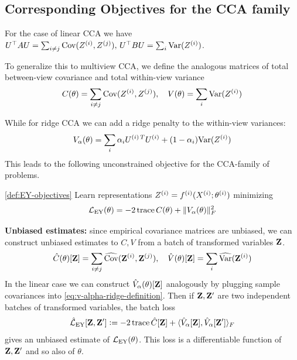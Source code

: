 \subsection{Corresponding Objectives for the CCA family}
For the case of linear CCA we have $U^\top A U = \sum_{i \neq j} \mathrm{Cov}(Z^{(i)}, Z^{(j)}),\,  U^\top B U = \sum_{i} \mathrm{Var}(Z^{(i)})$. 

To generalize this to multiview CCA, we define the analogous matrices of total between-view covariance and total within-view variance 
\begin{align}\label{eq:def-C-V-matrices}
    \vphantom{\bigl(\bigr)} %
    C(\theta) = \sum_{i \neq j} \Cov(Z\sps{i}, Z\sps{j}), \quad 
    V(\theta) = \sum_{i} \Var(Z\sps{i})
\end{align}

While for ridge CCA we can add a ridge penalty to the within-view variances:
\begin{align}\label{eq:v-alpha-ridge-definition}
    V_\alpha(\theta) = \sum_i \alpha_i {U^{(i)\,T}} U^{(i)} +  (1 - \alpha_i) \mathrm{Var}(Z^{(i)})
\end{align}
This leads to the following unconstrained objective for the CCA-family of problems.
\begin{definition}\ref{def:EY-objectives}
    Learn representations $Z^{(i)} = f^{(i)}( X^{(i)}; \theta^{(i)})$ minimizing
    \begin{align}\label{eq:EY-loss-def-C-V}
        \mathcal{L}_\text{EY}(\theta) = - 2 \operatorname{trace} C(\theta) + \lVert V_\alpha(\theta)\rVert_F^2
    \end{align}
\end{definition}

\textbf{Unbiased estimates:}
since empirical covariance matrices are unbiased, we can construct unbiased estimates to $C, V$ from a batch of transformed variables $\mathbf{Z}$.
\begin{align}\label{eq:def-C-V-matrices-empirical}
    \hat{C}(\theta)[\mathbf{Z}] = \sum_{i \neq j} \widehat{\mathrm{Cov}}(\mathbf{Z}^{(i)}, \mathbf{Z}^{(j)}), \quad 
    \hat{V}(\theta)[\mathbf{Z}] = \sum_{i} \widehat{\mathrm{Var}}(\mathbf{Z}^{(i)})
\end{align}
In the linear case we can construct $\hat{V}_\alpha(\theta)[\mathbf{Z}]$ analogously by plugging sample covariances into \cref{eq:v-alpha-ridge-definition}.
Then if $\mathbf{Z}, \mathbf{Z}'$ are two independent batches of transformed variables, the batch loss
\begin{align}\label{eq:empirical-EY-loss-estimate-def}
    \hat{\mathcal{L}}_\text{EY}[\mathbf{Z}, \mathbf{Z}'] \vcentcolon= - 2 \operatorname{trace} \hat{C}[\mathbf{Z}] + \langle \hat{V}_\alpha[\mathbf{Z}], \hat{V}_\alpha[\mathbf{Z}'] \rangle_F
\end{align}
gives an unbiased estimate of $\mathcal{L}_\text{EY}(\theta)$.%
This loss is a differentiable function of $\mathbf{Z}, \mathbf{Z}'$ and so also of $\theta$.

